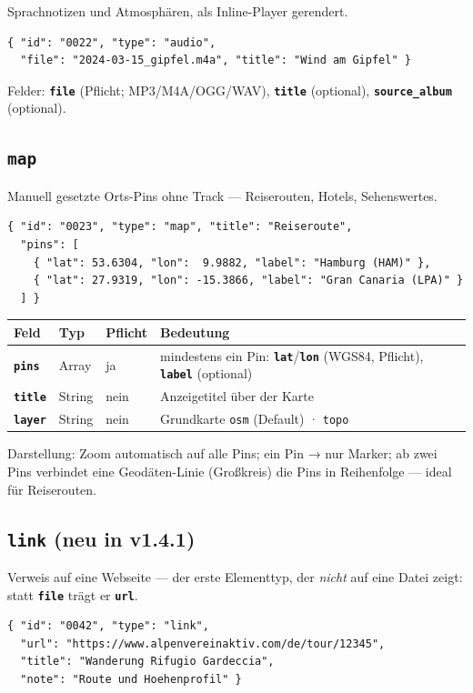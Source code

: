 \documentclass[11pt,a4paper]{article}
\let\mpdtt\texttt
\renewcommand{\texttt}[1]{\mpdtt{\textcolor{mpdred}{#1}}}
\newcommand{\feld}[1]{\mpdtt{\textbf{\textcolor{mpdred}{#1}}}}
\newcommand{\kopf}[1]{\textbf{#1}}
\begin{document}
Sprachnotizen und Atmosphären, als Inline-Player gerendert.

\begin{lstlisting}
{ "id": "0022", "type": "audio",
  "file": "2024-03-15_gipfel.m4a", "title": "Wind am Gipfel" }
\end{lstlisting}

Felder: \feld{file} (Pflicht; MP3/M4A/OGG/WAV), \feld{title} (optional),
\feld{source\_album} (optional).

\subsection{\texttt{map}}

Manuell gesetzte Orts-Pins ohne Track — Reiserouten, Hotels, Sehenswertes.

\begin{lstlisting}
{ "id": "0023", "type": "map", "title": "Reiseroute",
  "pins": [
    { "lat": 53.6304, "lon":  9.9882, "label": "Hamburg (HAM)" },
    { "lat": 27.9319, "lon": -15.3866, "label": "Gran Canaria (LPA)" }
  ] }
\end{lstlisting}

\begin{tabularx}{\linewidth}{|l|l|l|L|}
\hline
{}\kopf{Feld} & \kopf{Typ} & \kopf{Pflicht} & \kopf{Bedeutung} \\
\hline
\feld{pins} & Array & ja & mindestens ein Pin: \feld{lat}/\feld{lon}
  (WGS84, Pflicht), \feld{label} (optional) \\
\feld{title} & String & nein & Anzeigetitel über der Karte \\
\feld{layer} & String & nein & Grundkarte \texttt{osm} (Default) · \texttt{topo} \\
\hline
\end{tabularx}

Darstellung: Zoom automatisch auf alle Pins; ein Pin → nur Marker;
ab zwei Pins verbindet eine Geodäten-Linie (Großkreis) die Pins in
Reihenfolge — ideal für Reiserouten.

\subsection{\texttt{link} \; (neu in v1.4.1)}\label{sec:link}

Verweis auf eine Webseite — der erste Elementtyp, der \emph{nicht} auf
eine Datei zeigt: statt \feld{file} trägt er \feld{url}.

\begin{lstlisting}
{ "id": "0042", "type": "link",
  "url": "https://www.alpenvereinaktiv.com/de/tour/12345",
  "title": "Wanderung Rifugio Gardeccia",
  "note": "Route und Hoehenprofil" }
\end{lstlisting}
\end{document}
